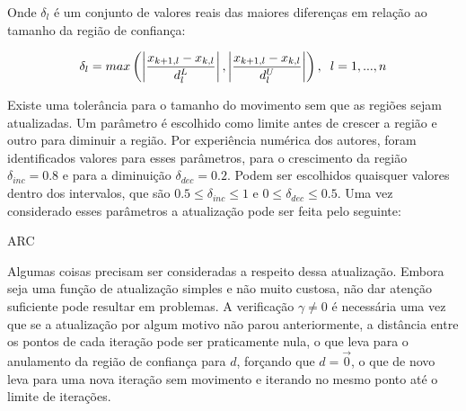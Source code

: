 Onde \(\delta_l\) é um conjunto de valores reais das maiores diferenças em relação ao
tamanho da região de confiança:

\begin{equation}
  \delta_l = max \left ( \left | \frac{x_{k+1, l} - x_{k, l}}{d^L_l} \right |, \left | \frac{x_{k+1, l} - x_{k, l}}{d^U_l} \right | \right ), \hspace{0.2cm} l = 1, ..., n
\end{equation}

Existe uma tolerância para o tamanho do movimento sem que as regiões sejam atualizadas.
Um parâmetro é escolhido como limite antes de crescer a região e outro para diminuir a
região. Por experiência numérica dos autores, foram identificados valores para esses
parâmetros, para o crescimento da região \(\delta_{inc} = 0.8\) e para a diminuição
\(\delta_{dec} = 0.2\). Podem ser escolhidos quaisquer valores dentro dos intervalos,
que são \(0.5 \leq \delta_{inc} \leq 1\) e \(0 \leq \delta_{dec} \leq 0.5\). Uma
vez considerado esses parâmetros a atualização pode ser feita pelo seguinte:

\vspace{15pt}
\begin{algorithm}[H]
  \SetAlgoLined
  \caption{ARC}
\end{algorithm}
\vspace{15pt}

Algumas coisas precisam ser consideradas a respeito dessa atualização. Embora seja
uma função de atualização simples e não muito custosa, não dar atenção suficiente
pode resultar em problemas. A verificação \(\gamma \ne 0\) é necessária uma vez que
se a atualização por algum motivo não parou anteriormente, a distância entre os
pontos de cada iteração pode ser praticamente nula, o que leva para o anulamento
da região de confiança para \(d\), forçando que \(d = \overrightarrow 0\), o que
de novo leva para uma nova iteração sem movimento e iterando no mesmo ponto até
o limite de iterações.